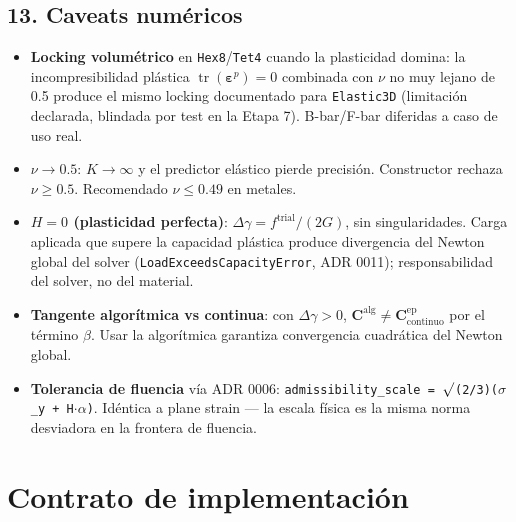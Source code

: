 \documentclass[11pt,letterpaper,oneside]{report}
\begin{document}
\subsection{13. Caveats numéricos}

\begin{itemize}
  \item \textbf{Locking volumétrico} en \texttt{Hex8}/\texttt{Tet4} cuando la plasticidad domina: la incompresibilidad plástica $\operatorname{tr}(\boldsymbol\varepsilon^p) = 0$ combinada con $\nu$ no muy lejano de 0.5 produce el mismo locking documentado para \texttt{Elastic3D} (limitación declarada, blindada por test en la Etapa 7). B-bar/F-bar diferidas a caso de uso real.
  \item \textbf{$\nu \to 0.5$}: $K \to \infty$ y el predictor elástico pierde precisión. Constructor rechaza $\nu \geq 0.5$. Recomendado $\nu \leq 0.49$ en metales.
  \item \textbf{$H = 0$ (plasticidad perfecta)}: $\Delta\gamma = f^\text{trial}/(2G)$, sin singularidades. Carga aplicada que supere la capacidad plástica produce divergencia del Newton global del solver (\texttt{LoadExceedsCapacityError}, ADR 0011); responsabilidad del solver, no del material.
  \item \textbf{Tangente algorítmica vs continua}: con $\Delta\gamma > 0$, $\mathbf C^\text{alg} \neq \mathbf C^\text{ep}_\text{continuo}$ por el término $\beta$. Usar la algorítmica garantiza convergencia cuadrática del Newton global.
  \item \textbf{Tolerancia de fluencia} vía ADR 0006: \texttt{admissibility\_scale = \ensuremath{\surd}(2/3)(\ensuremath{\sigma}\_y + H\ensuremath{\cdot}\ensuremath{\alpha})}. Idéntica a plane strain --- la escala física es la misma norma desviadora en la frontera de fluencia.
\end{itemize}


\section{Contrato de implementación}
\end{document}
